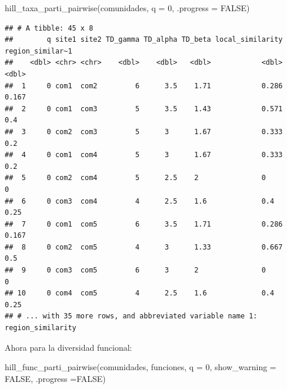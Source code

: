 \documentclass[
]{article}
\newenvironment{Shaded}{\begin{snugshade}}{\end{snugshade}}
\newcommand{\AttributeTok}[1]{\textcolor[rgb]{0.77,0.63,0.00}{#1}}
\newcommand{\ConstantTok}[1]{\textcolor[rgb]{0.00,0.00,0.00}{#1}}
\newcommand{\DecValTok}[1]{\textcolor[rgb]{0.00,0.00,0.81}{#1}}
\newcommand{\FunctionTok}[1]{\textcolor[rgb]{0.00,0.00,0.00}{#1}}
\newcommand{\NormalTok}[1]{#1}
\begin{document}
\begin{Shaded}
\begin{Highlighting}[]
\FunctionTok{hill\_taxa\_parti\_pairwise}\NormalTok{(comunidades, }\AttributeTok{q =} \DecValTok{0}\NormalTok{, }\AttributeTok{.progress =} \ConstantTok{FALSE}\NormalTok{)}
\end{Highlighting}
\end{Shaded}

\begin{verbatim}
## # A tibble: 45 x 8
##        q site1 site2 TD_gamma TD_alpha TD_beta local_similarity region_similar~1
##    <dbl> <chr> <chr>    <dbl>    <dbl>   <dbl>            <dbl>            <dbl>
##  1     0 com1  com2         6      3.5    1.71            0.286            0.167
##  2     0 com1  com3         5      3.5    1.43            0.571            0.4  
##  3     0 com2  com3         5      3      1.67            0.333            0.2  
##  4     0 com1  com4         5      3      1.67            0.333            0.2  
##  5     0 com2  com4         5      2.5    2               0                0    
##  6     0 com3  com4         4      2.5    1.6             0.4              0.25 
##  7     0 com1  com5         6      3.5    1.71            0.286            0.167
##  8     0 com2  com5         4      3      1.33            0.667            0.5  
##  9     0 com3  com5         6      3      2               0                0    
## 10     0 com4  com5         4      2.5    1.6             0.4              0.25 
## # ... with 35 more rows, and abbreviated variable name 1: region_similarity
\end{verbatim}

Ahora para la diversidad funcional:\\

\begin{Shaded}
\begin{Highlighting}[]
\FunctionTok{hill\_func\_parti\_pairwise}\NormalTok{(comunidades, funciones, }\AttributeTok{q =} \DecValTok{0}\NormalTok{, }\AttributeTok{show\_warning =} \ConstantTok{FALSE}\NormalTok{, }\AttributeTok{.progress =}\ConstantTok{FALSE}\NormalTok{)}
\end{Highlighting}
\end{Shaded}
\end{document}
